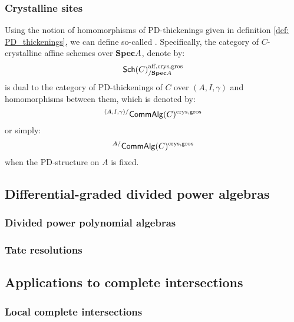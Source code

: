             \subsubsection{Crystalline sites}
                \begin{definition} \label{def: crystalline_affine_schemes}
                    Using the notion of homomorphisms of PD-thickenings given in definition \ref{def: PD_thickenings}, we can define so-called . Specifically, the category of $C$-crystalline affine schemes over $\mathbf{Spec} A$, denote by:
                        $$\mathsf{Sch}(C)^{\mathrm{aff}, \mathrm{crys}, \mathrm{gros}}_{/\mathbf{Spec} A}$$
                    is dual to the category of PD-thickenings of $C$ over $(A, I, \gamma)$ and homomorphisms between them, which is denoted by:
                        $${}^{(A, I, \gamma)/}\mathsf{Comm}\mathsf{Alg}(C)^{\mathrm{crys}, \mathrm{gros}}$$
                    or simply:
                        $${}^{A/}\mathsf{Comm}\mathsf{Alg}(C)^{\mathrm{crys}, \mathrm{gros}}$$
                    when the PD-structure on $A$ is fixed.
                \end{definition}
                \begin{remark} \label{remark: big_and_small_categories_of_crystalline_affine_schemes}
                    
                \end{remark}
        
        \subsection{Differential-graded divided power algebras}
            \subsubsection{Divided power polynomial algebras}
            
            \subsubsection{Tate resolutions}
            
        \subsection{Applications to complete intersections}
            \subsubsection{Local complete intersections}
            
